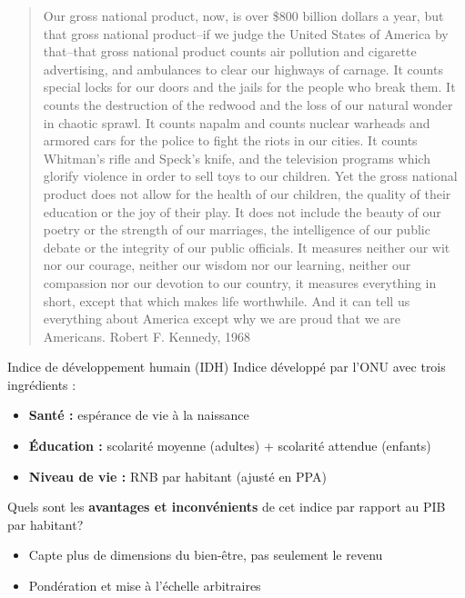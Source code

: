 \documentclass[aspectratio=169]{beamer}
\begin{document}
\begin{frame}{}
   \small
   \begin{quotation}
      Our gross national product, now, is over \$800 billion dollars a year, but that gross national product–if we judge the United States of America by that–that gross national product counts air pollution and cigarette advertising, and ambulances to clear our highways of carnage. It counts special locks for our doors and the jails for the people who break them. It counts the destruction of the redwood and the loss of our natural wonder in chaotic sprawl. It counts napalm and counts nuclear warheads and armored cars for the police to fight the riots in our cities. It counts Whitman's rifle and Speck's knife, and the television programs which glorify violence in order to sell toys to our children. Yet the gross national product does not allow for the health of our children, the quality of their education or the joy of their play. It does not include the beauty of our poetry or the strength of our marriages, the intelligence of our public debate or the integrity of our public officials. It measures neither our wit nor our courage, neither our wisdom nor our learning, neither our compassion nor our devotion to our country, it measures everything in short, except that which makes life worthwhile. And it can tell us everything about America except why we are proud that we are Americans.
      \hfill{\scriptsize\textcolor{HECgray}{Robert F. Kennedy, 1968}}
   \end{quotation}
\end{frame}

\begin{frame}{Indice de d\'eveloppement humain (IDH)}
   Indice d\'evelopp\'e par l'ONU avec trois ingr\'edients :
   \vspace{0.15cm}
   \begin{itemize}
      \setlength\itemsep{0.15cm}
      \item \textbf{Sant\'e :} esp\'erance de vie \`a la naissance
      \item \textbf{\'Education :} scolarit\'e moyenne (adultes) + scolarit\'e attendue (enfants)
      \item \textbf{Niveau de vie :} RNB par habitant (ajust\'e en PPA)
   \end{itemize}
   \vspace{0.5cm}
   Quels sont les \textbf{avantages et inconv\'enients} de cet indice par rapport au PIB par habitant?
   \vspace{0.15cm}
   \begin{itemize}
      \setlength\itemsep{0.15cm}
      \item Capte plus de dimensions du bien-\^etre, pas seulement le revenu
      \item Pond\'eration et mise \`a l'\'echelle arbitraires
   \end{itemize}
\end{frame}
\end{document}
